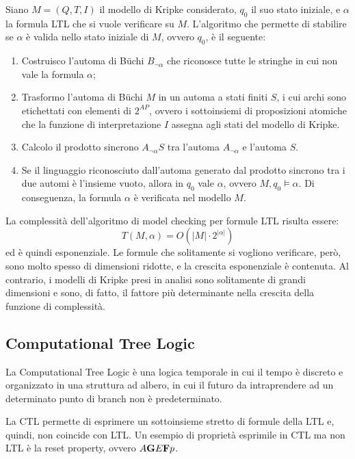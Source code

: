 Siano $M = (Q, T, I)$ il modello di Kripke considerato, $q_0$ il suo stato
iniziale, e $\alpha$ la formula LTL che si vuole verificare su $M$.
L'algoritmo che permette di stabilire se $\alpha$ è valida nello stato iniziale
di $M$, ovvero $q_0$, è il seguente:
\begin{enumerate}
    \item Costruisco l'automa di B\"uchi $B_{\lnot \alpha}$ che riconosce
    tutte le stringhe in cui non vale la formula $\alpha$;
    \item Trasformo l'automa di B\"uchi $M$ in un automa a stati finiti $S$,
    i cui archi sono etichettati con elementi di $2^{AP}$, ovvero i sottoinsiemi
    di proposizioni atomiche che la funzione di interpretazione $I$ assegna
    agli stati del modello di Kripke.
    \item Calcolo il prodotto sincrono $A_{\lnot \alpha} S$ tra l'automa
    $A_{\lnot \alpha}$ e l'automa $S$.
    \item Se il linguaggio riconosciuto dall'automa generato dal prodotto sincrono
    tra i due automi è l'insieme vuoto, allora in $q_0$ vale $\alpha$, ovvero
    $M, q_0 \vDash \alpha$. Di conseguenza, la formula $\alpha$ è verificata
    nel modello $M$.
\end{enumerate}


La complessità dell'algoritmo di model checking per formule LTL
risulta essere:
\[
    T(M, \alpha) = O(|M| \cdot 2^{|\alpha|})
\]
ed è quindi esponenziale.
Le formule che solitamente si vogliono verificare, però, sono molto spesso
di dimensioni ridotte, e la crescita esponenziale è contenuta.
Al contrario, i modelli di Kripke presi in analisi sono solitamente di grandi
dimensioni e sono, di fatto, il fattore più determinante nella crescita della
funzione di complessità.

\subsection{Computational Tree Logic}
La Computational Tree Logic è una logica temporale in cui il tempo è discreto
e organizzato in una struttura ad albero, in cui il futuro da intraprendere
ad un determinato punto di branch non è predeterminato.

La CTL permette di esprimere un sottoinsieme stretto di formule della LTL
e, quindi, non coincide con LTL.
Un esempio di proprietà esprimile in CTL ma non LTL è la reset property, ovvero
$A \textnormal{\textbf{G}} E \textnormal{\textbf{F}} p$.

